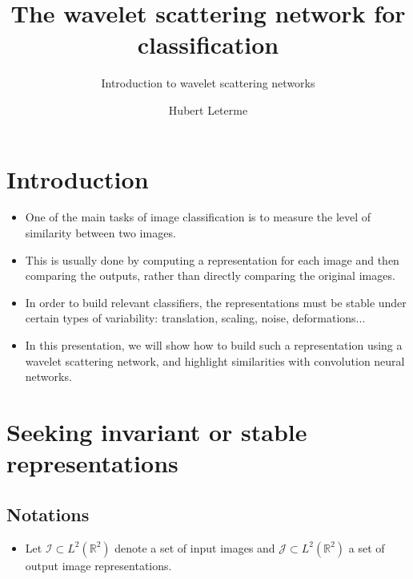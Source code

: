 \documentclass[10pt]{beamer}
\title{The wavelet scattering network for classification}
\subtitle{Introduction to wavelet scattering networks} %
\author{Hubert Leterme}
\newcommand{\mathR}{\mathbb{R}}
\newcommand{\MI}{{\mathcal I}}
\newcommand{\MJ}{{\mathcal J}}
\begin{document}
  \frame{\maketitle}


  \begin{darkframes}
  
    \section{Introduction}
    
    \begin{frame}[label=intro]{\secname}
    \begin{itemize}
        \item One of the main tasks of image classification is to measure the level of similarity between two images.
        \item This is usually done by computing a representation for each image and then comparing the outputs, rather than directly comparing the original images.
        \item In order to build relevant classifiers, the representations must be stable under certain types of variability: translation, scaling, noise, deformations...
        \item In this presentation, we will show how to build such a representation using a wavelet scattering network, and highlight similarities with convolution neural networks.
    \end{itemize}
    \end{frame}
  
    \section{Seeking invariant or stable representations}
    
    \subsection{Notations}
    
    \begin{frame}[label=not]{\subsecname}
    \begin{itemize}
        \item Let $\MI \subset L^2(\mathR^2)$ denote a set of input images and $\MJ \subset L^2(\mathR^2)$ a set of output image representations.
    

\end{itemize}
\end{frame}
\end{darkframes}
\end{document}
